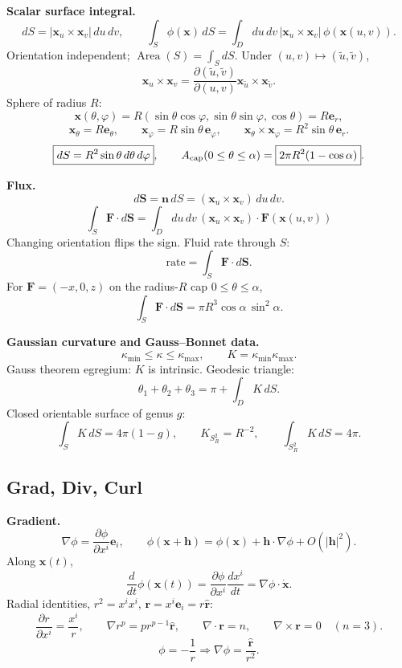 \noindent\textbf{Scalar surface integral.}
\[
dS=|\mathbf{x}_u\times\mathbf{x}_v|\,du\,dv,
\qquad
\boxed{\int_S\phi(\mathbf{x})\,dS
=\int_Ddu\,dv\,|\mathbf{x}_u\times\mathbf{x}_v|\,
\phi(\mathbf{x}(u,v)).}
\]
Orientation independent; $\operatorname{Area}(S)=\int_SdS$. Under
$(u,v)\mapsto(\tilde u,\tilde v)$,
\[
\mathbf{x}_u\times\mathbf{x}_v
=\frac{\partial(\tilde u,\tilde v)}{\partial(u,v)}
\mathbf{x}_{\tilde u}\times\mathbf{x}_{\tilde v}.
\]
Sphere of radius $R$:
\[
\mathbf{x}(\theta,\varphi)
=R(\sin\theta\cos\varphi,\sin\theta\sin\varphi,\cos\theta)=R\mathbf{e}_r,
\]
\[
\mathbf{x}_\theta=R\mathbf{e}_\theta,\qquad
\mathbf{x}_\varphi=R\sin\theta\,\mathbf{e}_\varphi,\qquad
\mathbf{x}_\theta\times\mathbf{x}_\varphi
=R^2\sin\theta\,\mathbf{e}_r.
\]
\[
\boxed{dS=R^2\sin\theta\,d\theta\,d\varphi},\qquad
A_{\rm cap}(0\le\theta\le\alpha)=\boxed{2\pi R^2(1-\cos\alpha)}.
\]

\noindent\textbf{Flux.}
\[
d\mathbf{S}=\mathbf{n}\,dS
=(\mathbf{x}_u\times\mathbf{x}_v)\,du\,dv.
\]
\[
\boxed{\int_S\mathbf{F}\cdot d\mathbf{S}
=\int_Ddu\,dv\,
(\mathbf{x}_u\times\mathbf{x}_v)\cdot\mathbf{F}(\mathbf{x}(u,v))}
\]
Changing orientation flips the sign. Fluid rate through $S$:
\[
\text{rate}=\int_S\mathbf{F}\cdot d\mathbf{S}.
\]
For $\mathbf{F}=(-x,0,z)$ on the radius-$R$ cap $0\le\theta\le\alpha$,
\[
\int_S\mathbf{F}\cdot d\mathbf{S}
=\boxed{\pi R^3\cos\alpha\,\sin^2\alpha}.
\]

\noindent\textbf{Gaussian curvature and Gauss--Bonnet data.}
\[
\kappa_{\min}\le\kappa\le\kappa_{\max},\qquad
\boxed{K=\kappa_{\min}\kappa_{\max}}.
\]
Gauss theorem egregium: $K$ is intrinsic. Geodesic triangle:
\[
\boxed{\theta_1+\theta_2+\theta_3
=\pi+\int_DK\,dS}.
\]
Closed orientable surface of genus $g$:
\[
\boxed{\int_SK\,dS=4\pi(1-g)},\qquad
K_{S_R^2}=R^{-2},\qquad \int_{S^2_R}K\,dS=4\pi.
\]

\subsection{Grad, Div, Curl}

\noindent\textbf{Gradient.}
\[
\nabla\phi=\frac{\partial\phi}{\partial x^i}\mathbf{e}_i,\qquad
\phi(\mathbf{x}+\mathbf{h})
=\phi(\mathbf{x})+\mathbf{h}\cdot\nabla\phi+O(|\mathbf{h}|^2).
\]
Along $\mathbf{x}(t)$,
\[
\frac{d}{dt}\phi(\mathbf{x}(t))
=\frac{\partial\phi}{\partial x^i}\frac{dx^i}{dt}
=\nabla\phi\cdot\dot{\mathbf{x}}.
\]
Radial identities, $r^2=x^ix^i$, $\mathbf{r}=x^i\mathbf{e}_i=r\hat{\mathbf{r}}$:
\[
\frac{\partial r}{\partial x^i}=\frac{x^i}{r},\qquad
\nabla r^p=pr^{p-1}\hat{\mathbf{r}},\qquad
\nabla\cdot\mathbf{r}=n,\qquad
\nabla\times\mathbf{r}=0\quad(n=3).
\]
\[
\phi=-\frac1r\Rightarrow \nabla\phi=\frac{\hat{\mathbf{r}}}{r^2}.
\]

